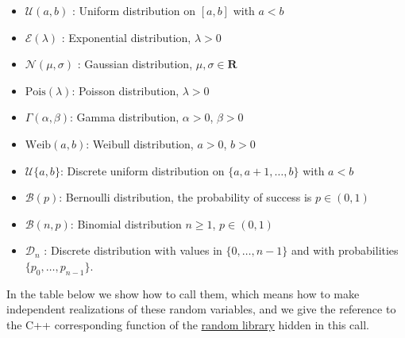 \begin{itemize}
\item
  \(\mathcal{U}(a,b)\) : Uniform distribution on \([a, b]\) with \(a < b\)
\item
  \(\mathcal{E}(\lambda)\) : Exponential distribution, \(\lambda > 0\)
\item
  \(\mathcal{N}(\mu,\sigma)\) : Gaussian distribution, \(\mu, \sigma \in \mathbf{R}\)
\item
  \(\mathrm{Pois}(\lambda)\): Poisson distribution, \(\lambda > 0\)
\item
  \(\Gamma(\alpha, \beta)\): Gamma distribution, \(\alpha > 0\), \(\beta > 0\)
\item
  \(\mathrm{Weib}(a, b)\): Weibull distribution, \(a > 0\), \(b > 0\)
\item
  \(\mathcal{U}\{a, b\}\): Discrete uniform distribution on \(\{a, a+1, \dots, b\}\) with \(a < b\)
\item
  \(\mathcal{B}(p)\): Bernoulli distribution, the probability of success is \(p \in (0,1)\)
\item
  \(\mathcal{B}(n, p)\): Binomial distribution \(n \ge 1\), \(p \in (0,1)\)
\item
  \(\mathcal{D}_n\) : Discrete distribution with values in \(\{ 0, \dots, n-1 \}\) and with probabilities \(\{p_0, \dots, p_{n-1}\}\).
\end{itemize}

In the table below we show how to call them, which means how to make independent realizations of these random variables, and we give the reference to the C++ corresponding function of the \href{http://www.cplusplus.com/reference/random/}{random library} hidden in this call.

